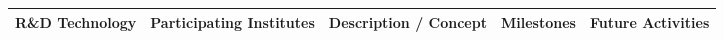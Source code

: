 \thispagestyle{empty}
\begin{landscape}
\begin{sidewaystable}
    \centering
    \begin{adjustbox}{max width=1.1\textwidth,totalheight=1\textheight}
\begin{tabularx}{2\textheight}{lXXXX}
    \toprule
    R\&D Technology & Participating Institutes & Description / Concept & Milestones & Future Activities \\
    \midrule
    \bottomrule
\end{tabularx}
\end{adjustbox}
\end{sidewaystable}
\end{landscape}
\restoregeometry
